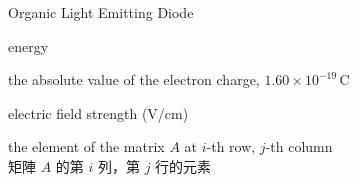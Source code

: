 
\begin{SymEntry}

\item[OLED]
Organic Light Emitting Diode

\item[$E$]
energy

\item[$e$]
the absolute value of the electron charge, $1.60\times10^{-19}\,\text{C}$
 
\item[$\mathscr{E}$]
electric field strength (V/cm)

\item[{$A[i,j]$}]
the  element of the matrix $A$ at $i$-th row, $j$-th column\\
矩陣 $A$ 的第 $i$ 列，第 $j$ 行的元素

\end{SymEntry}